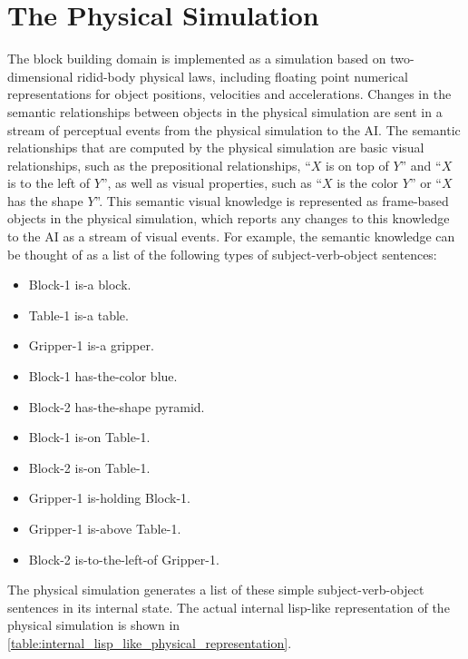 \section{The Physical Simulation}

The block building domain is implemented as a simulation based on
two-dimensional ridid-body physical laws, including floating point
numerical representations for object positions, velocities and
accelerations.  Changes in the semantic relationships between objects
in the physical simulation are sent in a stream of perceptual events
from the physical simulation to the AI.  The semantic relationships
that are computed by the physical simulation are basic visual
relationships, such as the prepositional relationships, ``$X$ is on
top of $Y$'' and ``$X$ is to the left of $Y$'', as well as visual
properties, such as ``$X$ is the color $Y$'' or ``$X$ has the shape
$Y$''.  This semantic visual knowledge is represented as frame-based
objects in the physical simulation, which reports any changes to this
knowledge to the AI as a stream of visual events.  For example, the
semantic knowledge can be thought of as a list of the following types
of subject-verb-object sentences:
\begin{itemize}
\item Block-1 is-a block.
\item Table-1 is-a table.
\item Gripper-1 is-a gripper.
\item Block-1 has-the-color blue.
\item Block-2 has-the-shape pyramid.
\item Block-1 is-on Table-1.
\item Block-2 is-on Table-1.
\item Gripper-1 is-holding Block-1.
\item Gripper-1 is-above Table-1.
\item Block-2 is-to-the-left-of Gripper-1.
\end{itemize}
The physical simulation generates a list of these simple
subject-verb-object sentences in its internal state.  The actual
internal lisp-like representation of the physical simulation is shown
in \autoref{table:internal_lisp_like_physical_representation}.
